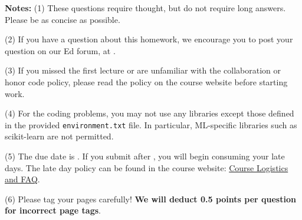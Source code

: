 {\bf Notes:} 
(1) These questions require thought, but do not require long
answers. Please be as concise as possible.  

(2) If you have a question
about this homework, we encourage you to post your question on our
Ed forum, at \edstem. 

(3) If you
missed the first lecture or are unfamiliar with the collaboration or honor
code policy, please read the policy on the course website before starting work.

(4) For the coding problems, you may not
use any libraries except those defined in the provided \texttt{environment.txt}
file. In particular, ML-specific libraries such as scikit-learn are not
permitted. 

(5) The due date is \due. If you submit after
\due, you will begin consuming your
late days. The late day policy can be found in the course website:  \href{https://docs.google.com/document/d/1OCFrAj-Zniw5gzjeAKxVRFCvi-u0qnTv/edit#heading=h.gjdgxs}{Course Logistics and FAQ}.

(6) Please tag your pages carefully! {\bf We will deduct 0.5 points per question for incorrect page tags}.

